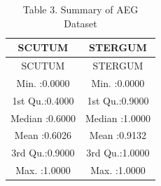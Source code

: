 \begin{longtable}[]{@{}cc@{}}
\caption{Table 3. Summary of AEG Dataset}\tabularnewline
\toprule
\begin{minipage}[b]{0.22\columnwidth}\centering\strut
SCUTUM\strut
\end{minipage} & \begin{minipage}[b]{0.22\columnwidth}\centering\strut
STERGUM\strut
\end{minipage}\tabularnewline
\midrule
\endfirsthead
\toprule
\begin{minipage}[b]{0.22\columnwidth}\centering\strut
SCUTUM\strut
\end{minipage} & \begin{minipage}[b]{0.22\columnwidth}\centering\strut
STERGUM\strut
\end{minipage}\tabularnewline
\midrule
\endhead
\begin{minipage}[t]{0.22\columnwidth}\centering\strut
Min. :0.0000\strut
\end{minipage} & \begin{minipage}[t]{0.22\columnwidth}\centering\strut
Min. :0.0000\strut
\end{minipage}\tabularnewline
\begin{minipage}[t]{0.22\columnwidth}\centering\strut
1st Qu.:0.4000\strut
\end{minipage} & \begin{minipage}[t]{0.22\columnwidth}\centering\strut
1st Qu.:0.9000\strut
\end{minipage}\tabularnewline
\begin{minipage}[t]{0.22\columnwidth}\centering\strut
Median :0.6000\strut
\end{minipage} & \begin{minipage}[t]{0.22\columnwidth}\centering\strut
Median :1.0000\strut
\end{minipage}\tabularnewline
\begin{minipage}[t]{0.22\columnwidth}\centering\strut
Mean :0.6026\strut
\end{minipage} & \begin{minipage}[t]{0.22\columnwidth}\centering\strut
Mean :0.9132\strut
\end{minipage}\tabularnewline
\begin{minipage}[t]{0.22\columnwidth}\centering\strut
3rd Qu.:0.9000\strut
\end{minipage} & \begin{minipage}[t]{0.22\columnwidth}\centering\strut
3rd Qu.:1.0000\strut
\end{minipage}\tabularnewline
\begin{minipage}[t]{0.22\columnwidth}\centering\strut
Max. :1.0000\strut
\end{minipage} & \begin{minipage}[t]{0.22\columnwidth}\centering\strut
Max. :1.0000\strut
\end{minipage}\tabularnewline
\bottomrule
\end{longtable}

